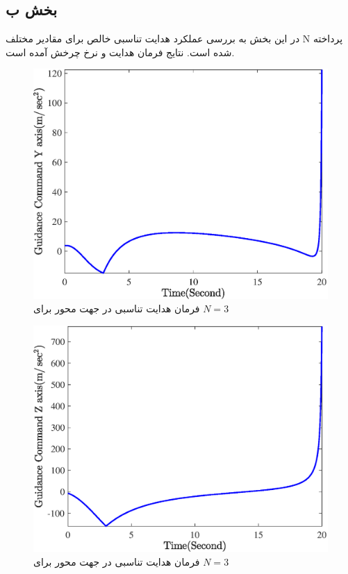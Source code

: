 \subsection{بخش ب}
در این بخش به بررسی عملکرد هدایت تناسبی خالص برای مقادیر مختلف N پرداخته شده است. نتایج فرمان هدایت و نرخ چرخش آمده است.

\begin{figure}[H]
	\centering
	\includegraphics[width=.75\linewidth]{../Figure/Q1/b/GC_y_3}
	\caption{فرمان هدایت تناسبی در جهت محور
	 برای 
	 $N=3$}
\end{figure}

\begin{figure}[H]
	\centering
	\includegraphics[width=.75\linewidth]{../Figure/Q1/b/GC_z_3}
	\caption{فرمان هدایت تناسبی در جهت محور
		برای 
		$N=3$}
\end{figure}

